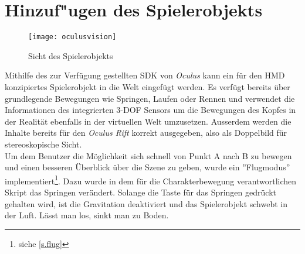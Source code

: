 \section{Hinzuf"ugen des Spielerobjekts}\label{s.ovr}
\begin{wrapfigure}{r}{0.5\textwidth}
	\vspace{-20pt}
	\begin{center}
		\texttt{[image: oculusvision]}
	\end{center}
	\vspace{-15pt}
	\caption{Sicht des Spielerobjekts}\label{oculusvision}
	\vspace{-12pt}
\end{wrapfigure}
Mithilfe des zur Verfügung gestellten SDK von \textit{Oculus} kann ein für den HMD konzipiertes Spielerobjekt in die Welt eingefügt werden. Es verfügt bereits über grundlegende Bewegungen wie Springen, Laufen oder Rennen und verwendet die Informationen des integrierten 3-DOF Sensors um die Bewegungen des Kopfes in der Realität ebenfalls in der virtuellen Welt umzusetzen. Ausserdem werden die Inhalte bereits für den \textit{Oculus Rift} korrekt ausgegeben, also als Doppelbild für stereoskopische Sicht.\\[6pt]
Um dem Benutzer die Möglichkeit sich schnell von Punkt A nach B zu bewegen und einen besseren Überblick über die Szene zu geben, wurde ein ''Flugmodus'' implementiert\footnote{siehe \ref{s.flug}}. Dazu wurde in dem für die Charakterbewegung verantwortlichen Skript das Springen verändert. Solange die Taste für das Springen gedrückt gehalten wird, ist die Gravitation deaktiviert und das Spielerobjekt schwebt in der Luft. Lässt man los, sinkt man zu Boden.


